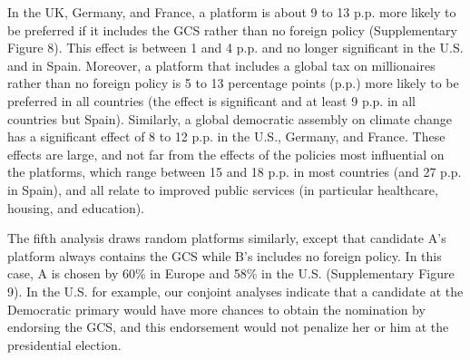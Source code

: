 \documentclass{nature}
\makeatletter
\renewenvironment*{figure}{\@float{figure}}{\end@float}
\makeatother
\begin{document}
In the UK, Germany, and France, a platform is about 9 to 13 p.p. more likely to be preferred if it includes the GCS rather than no foreign policy (Supplementary Figure 8). %
This effect is between 1 and 4 p.p. and no longer significant in the U.S. and in Spain. Moreover, a platform that includes a global tax on millionaires rather than no foreign policy is 5 to 13 percentage points (p.p.) more likely to be preferred in all countries (the effect is significant and at least 9 p.p. in all countries but Spain). 
Similarly, a global democratic assembly on climate change has a significant effect of 8 to 12 p.p. in the U.S., Germany, and France. 
These effects are large, and not far from the effects of the policies most influential on the platforms, which range between 15 and 18 p.p. in most countries (and 27 p.p. in Spain), and all relate to improved public services (in particular healthcare, housing, and education).

The fifth analysis draws random platforms similarly, except that candidate A's platform always contains the GCS while B's includes no foreign policy. In this case, A is chosen by 60\% in Europe %
and 58\% in the U.S. (Supplementary Figure 9). %
In the U.S. for example, our conjoint analyses indicate that a candidate at the Democratic primary would have more chances to obtain the nomination by endorsing the GCS, and this endorsement would not penalize her or him at the presidential election. 


\end{document}
